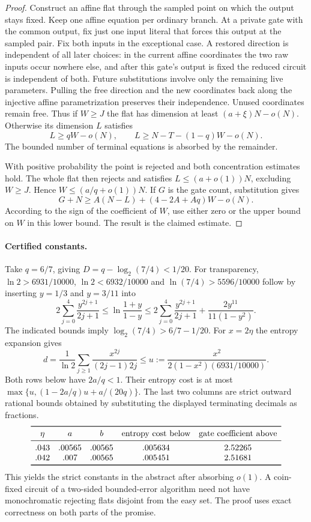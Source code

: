 \documentclass[11pt]{article}
\begin{document}
\begin{proof}
Construct an affine flat through the sampled point on which the output stays fixed. Keep one affine equation per ordinary branch. At a private gate with the common output, fix just one input literal that forces this output at the sampled pair. Fix both inputs in the exceptional case. A restored direction is independent of all later choices: in the current affine coordinates the two raw inputs occur nowhere else, and after this gate's output is fixed the reduced circuit is independent of both. Future substitutions involve only the remaining live parameters. Pulling the free direction and the new coordinates back along the injective affine parametrization preserves their independence. Unused coordinates remain free. Thus if $W\ge J$ the flat has dimension at least $(a+\xi)N-o(N)$. Otherwise its dimension $L$ satisfies
\[
 L\ge qW-o(N),\qquad L\ge N-T-(1-q)W-o(N).
\]
The bounded number of terminal equations is absorbed by the remainder.

With positive probability the point is rejected and both concentration estimates hold. The whole flat then rejects and satisfies $L\le(a+o(1))N$, excluding $W\ge J$. Hence $W\le (a/q+o(1))N$. If $G$ is the gate count, substitution gives
\[
 G+N\ge A(N-L)+(4-2A+Aq)W-o(N).
\]
According to the sign of the coefficient of $W$, use either zero or the upper bound on $W$ in this lower bound. The result is the claimed estimate.
\end{proof}

\paragraph{Certified constants.}
Take $q=6/7$, giving $D=q-\log_2(7/4)<1/20$. For transparency,
$\ln 2>6931/10000$, $\ln 2<6932/10000$ and $\ln(7/4)>5596/10000$ follow by inserting $y=1/3$ and $y=3/11$ into
\[
 2\sum_{j=0}^{4}\frac{y^{2j+1}}{2j+1}\le
 \ln\frac{1+y}{1-y}
 \le 2\sum_{j=0}^{4}\frac{y^{2j+1}}{2j+1}
       +\frac{2y^{11}}{11(1-y^2)} .
\]
The indicated bounds imply $\log_2(7/4)>6/7-1/20$. For $x=2\eta$ the entropy expansion gives
\[
 d=\frac1{\ln 2}\sum_{j\ge1}\frac{x^{2j}}{(2j-1)2j}
 \le u:=\frac{x^2}{2(1-x^2)(6931/10000)} .
\]
Both rows below have $2a/q<1$. Their entropy cost is at most
$\max\{u,(1-2a/q)u+a/(20q)\}$.
The last two columns are strict outward rational bounds obtained by substituting the displayed terminating decimals as fractions.
\[
\begin{array}{ccccc}\toprule
 \eta & a & b & \text{entropy cost below} & \text{gate coefficient above}\\\midrule
 .043 & .00565 & .00565 & .005634 & 2.52265\\
 .042 & .007 & .00565 & .005451 & 2.51681\\\bottomrule
\end{array}
\]
This yields the strict constants in the abstract after absorbing $o(1)$. A coin-fixed circuit of a two-sided bounded-error algorithm need not have monochromatic rejecting flats disjoint from the easy set. The proof uses exact correctness on both parts of the promise.

\end{document}
